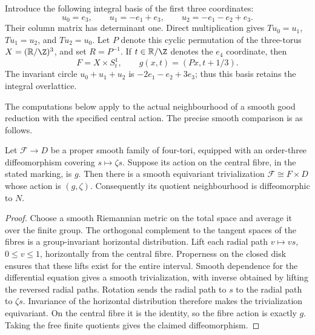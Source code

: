 Introduce the following integral basis of the first three coordinates:
\begin{equation}\label{marked-local:eq:permutation-basis}
 u_0=e_3,\qquad u_1=-e_1+e_3,\qquad
 u_2=-e_1-e_2+e_3.
\end{equation}
Their column matrix has determinant one. Direct multiplication gives
$Tu_0=u_1$, $Tu_1=u_2$, and $Tu_2=u_0$.
Let $P$ denote this cyclic permutation of the three-torus
$X=(\mathbb R/\Z)^3$, and set $R=P^{-1}$.
If $t\in\mathbb R/\Z$ denotes the $e_4$ coordinate, then
\begin{equation}\label{marked-local:eq:affine-product}
 F=X\times S^1_t,\qquad g(x,t)=(Px,t+1/3).
\end{equation}
The invariant circle $u_0+u_1+u_2$ is
$-2e_1-e_2+3e_3$; thus this basis retains the integral overlattice.

The computations below apply to the actual neighbourhood of a smooth
good reduction with the specified central action. The precise smooth
comparison is as follows.

\begin{proposition}\label{marked-local:prop:family}
Let $\mathcal F\to D$ be a proper smooth family of four-tori,
equipped with an order-three diffeomorphism covering $s\mapsto\zeta s$.
Suppose its action on the central fibre, in the stated marking, is $g$.
Then there is a smooth equivariant trivialization
$\mathcal F\cong F\times D$ whose action is $(g,\zeta)$.
Consequently its quotient neighbourhood is diffeomorphic to $N$.
\end{proposition}
\begin{proof}
Choose a smooth Riemannian metric on the total space and average it
over the finite group. The orthogonal complement to the tangent spaces
of the fibres is a group-invariant horizontal distribution. Lift each
radial path $v\mapsto vs$, $0\le v\le1$, horizontally from the
central fibre. Properness on the closed disk ensures that these lifts
exist for the entire interval. Smooth dependence for the differential
equation gives a smooth trivialization, with inverse obtained by lifting
the reversed radial paths. Rotation sends the radial path to $s$ to
the radial path to $\zeta s$. Invariance of the horizontal distribution
therefore makes the trivialization equivariant. On the central fibre
it is the identity, so the fibre action is exactly $g$.
Taking the free finite quotients gives the claimed diffeomorphism.
\end{proof}

